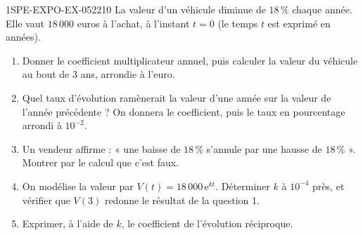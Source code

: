 \begin{exercice}{1SPE-EXPO-EX-052}{2}{10}
La valeur d'un véhicule diminue de $18\,\%$ chaque année. Elle vaut $18\,000$
euros à l'achat, à l'instant $t = 0$ (le temps $t$ est exprimé en années).
\begin{enumerate}
\item Donner le coefficient multiplicateur annuel, puis calculer la valeur du
  véhicule au bout de $3$ ans, arrondie à l'euro.
\item Quel taux d'évolution ramènerait la valeur d'une année sur la valeur de
  l'année précédente ? On donnera le coefficient, puis le taux en pourcentage
  arrondi à $10^{-2}$.
\item Un vendeur affirme : « une baisse de $18\,\%$ s'annule par une hausse de
  $18\,\%$ ». Montrer par le calcul que c'est faux.
\item On modélise la valeur par $V(t) = 18\,000\,\mathrm{e}^{kt}$. Déterminer
  $k$ à $10^{-4}$ près, et vérifier que $V(3)$ redonne le résultat de la
  question 1.
\item Exprimer, à l'aide de $k$, le coefficient de l'évolution réciproque.
\end{enumerate}
\end{exercice}
